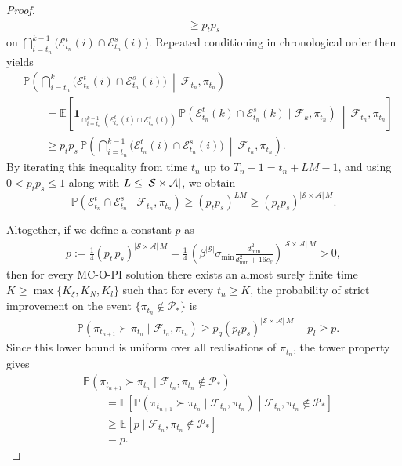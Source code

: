 \begin{proof}
\begin{align*}
\ge
p_t p_s
\end{align*}
on $\bigcap_{i=t_n}^{k-1} \big( \mathcal E^t_{t_n}(i) \cap \mathcal E^s_{t_n}(i) \big)$.
Repeated conditioning in chronological order then yields
\begin{align*}
&\mathbb P\!\left(
\bigcap_{i=t_n}^{k} \bigl( \mathcal E^t_{t_n}(i) \cap \mathcal E^s_{t_n}(i) \bigr)
\ \middle|\ \mathcal F_{t_n}, \pi_{t_n}
\right)
\\
&\qquad=
\mathbb E\!\left[
\mathbf 1_{\cap_{i=t_n}^{k-1}(\mathcal E^t_{t_n}(i) \cap \mathcal E^s_{t_n}(i))}
\,
\mathbb P\!\left(\mathcal E^t_{t_n}(k)\cap \mathcal E^s_{t_n}(k) \mid \mathcal F_{k}, \pi_{t_n} \right)
\ \middle|\ \mathcal F_{t_n}, \pi_{t_n}
\right]
\\
&\qquad\ge
p_t p_s\,
\mathbb P\!\left(
\bigcap_{i=t_n}^{k-1} \bigl( \mathcal E^t_{t_n}(i) \cap \mathcal E^s_{t_n}(i) \bigr)
\ \middle|\ \mathcal F_{t_n}, \pi_{t_n}
\right).
\end{align*}
By iterating this inequality from time $t_n$ up to $T_n-1 = t_n + L M -1$,
and using $0 < p_t p_s \le 1$ along with $L \le |\mathcal S \times \mathcal{A}|$,
we obtain 
\[
\mathbb P(\mathcal E^t_{t_n} \cap \mathcal E^s_{t_n} \mid \mathcal F_{t_n}, \pi_{t_n} )
\ge
(p_t p_s)^{LM}
\ge
(p_t p_s)^{|\mathcal S\times\mathcal A|\,M} .
\]

Altogether, if we define a constant $p$ as
\begin{align}
\label{eq: def lower bound probability} 
p
:=
\frac14
(p_t \, p_s)^{|\mathcal S \times \mathcal A| \, M}
=
\frac14\,
\left(
\beta^{|\mathcal S|}
\sigma_{\min}\frac{d_{\min}^2}{d_{\min}^2+16 c_v}
\right)^{|\mathcal S\times\mathcal A| \, M}
>0  ,
\end{align}
then for every MC-O-PI solution there exists an almost surely finite time $K \ge \max\{K_\xi, K_N, K_l\}$ such that for every $t_n \ge K$, the probability of strict improvement on the event $\{\pi_{t_n} \notin \mathcal P_*\}$ is
\begin{align*}
&\mathbb P\!\left(
\pi_{t_{n+1}} \succ \pi_{t_n}
\mid \mathcal F_{t_n}, \pi_{t_n}
\right)
\ge
p_g (p_t p_s)^{|\mathcal S\times\mathcal A|\,M} - p_{\overline l}
\ge
p .
\end{align*}
Since this lower bound is uniform over all realisations of $\pi_{t_n}$, the tower property gives
\begin{align*}
&\mathbb P\!\left(
\pi_{t_{n+1}} \succ \pi_{t_n}
\mid \mathcal F_{t_n}, \pi_{t_n} \notin \mathcal P_*
\right)
\\
&\qquad =
\mathbb E \! \left[ 
\mathbb P\!\left(
\pi_{t_{n+1}} \succ \pi_{t_n}
\mid \mathcal F_{t_n}, \pi_{t_n}
\right)
\middle| \mathcal F_{t_n}, \pi_{t_n} \notin \mathcal P_* \right]
\\
&\qquad \ge
\mathbb E [ p \mid \mathcal F_{t_n}, \pi_{t_n} \notin \mathcal P_* ]
\\
&\qquad =
p .
\end{align*}
\end{proof}

